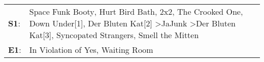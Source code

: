 \begin{supertabular}{p{0.03\textwidth}p{0.92\textwidth}}
 \textbf{S1}:  &  Space Funk Booty\textsuperscript{}, \enspace Hurt Bird Bath\textsuperscript{}, \enspace 2x2\textsuperscript{}, \enspace The Crooked One\textsuperscript{}, \enspace Down Under[1]\textsuperscript{}, \enspace Der Bluten Kat[2]\textsuperscript{} \textgreater \enspace JaJunk\textsuperscript{} \textgreater \enspace Der Bluten Kat[3]\textsuperscript{}, \enspace Syncopated Strangers\textsuperscript{}, \enspace Smell the Mitten\textsuperscript{}  \enspace  \\
 \textbf{E1}:  &                                                                                                                                                                                                                                                                                                                                                                            In Violation of Yes\textsuperscript{}, \enspace Waiting Room\textsuperscript{}  \enspace  \\
\end{supertabular}

